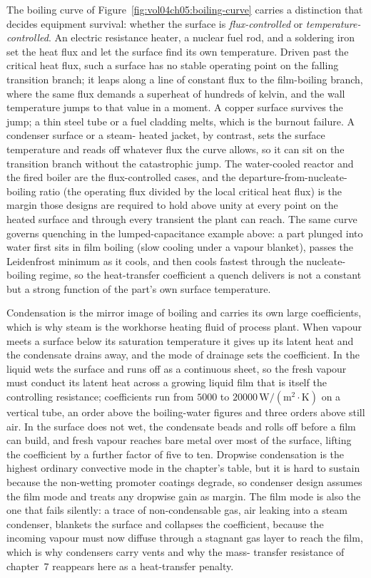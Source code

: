 The boiling curve of Figure~\ref{fig:vol04ch05:boiling-curve} carries a
distinction that decides equipment survival: whether the surface is
\emph{flux-controlled} or \emph{temperature-controlled}. An electric
resistance heater, a nuclear fuel rod, and a soldering iron set the heat
flux and let the surface find its own temperature. Driven past the
critical heat flux, such a surface has no stable operating point on the
falling transition branch; it leaps along a line of constant flux to the
film-boiling branch, where the same flux demands a superheat of hundreds
of kelvin, and the wall temperature jumps to that value in a moment. A
copper surface survives the jump; a thin steel tube or a fuel cladding
melts, which is the burnout failure. A condenser surface or a steam-
heated jacket, by contrast, sets the surface temperature and reads off
whatever flux the curve allows, so it can sit on the transition branch
without the catastrophic jump. The water-cooled reactor and the fired
boiler are the flux-controlled cases, and the departure-from-nucleate-
boiling ratio (the operating flux divided by the local critical heat
flux) is the margin those designs are required to hold above unity at
every point on the heated surface and through every transient the plant
can reach. The same curve governs quenching in the lumped-capacitance
example above: a part plunged into water first sits in film boiling
(slow cooling under a vapour blanket), passes the Leidenfrost minimum as
it cools, and then cools fastest through the nucleate-boiling regime, so
the heat-transfer coefficient a quench delivers is not a constant but a
strong function of the part's own surface temperature.

Condensation is the mirror image of boiling and carries its own large
coefficients, which is why steam is the workhorse heating fluid of process
plant. When vapour meets a surface below its saturation temperature it
gives up its latent heat and the condensate drains away, and the mode of
drainage sets the coefficient. In  the liquid
wets the surface and runs off as a continuous sheet, so the fresh vapour
must conduct its latent heat across a growing liquid film that is itself
the controlling resistance; coefficients run from $5000$ to $20000\,
\text{W}/(\text{m}^2\cdot\si{\kelvin})$ on a vertical tube, an order above
the boiling-water figures and three orders above still air. In
 the surface does not wet, the condensate
beads and rolls off before a film can build, and fresh vapour reaches bare
metal over most of the surface, lifting the coefficient by a further factor
of five to ten. Dropwise condensation is the highest ordinary
convective mode in the chapter's table, but it is hard to sustain because
the non-wetting promoter coatings degrade, so condenser design assumes the
film mode and treats any dropwise gain as margin. The film mode is also
the one that fails silently: a trace of non-condensable gas, air leaking
into a steam condenser, blankets the surface and collapses the coefficient,
because the incoming vapour must now diffuse through a stagnant gas layer to
reach the film, which is why condensers carry vents and why the mass-
transfer resistance of chapter~7 reappears here as a heat-transfer penalty.

